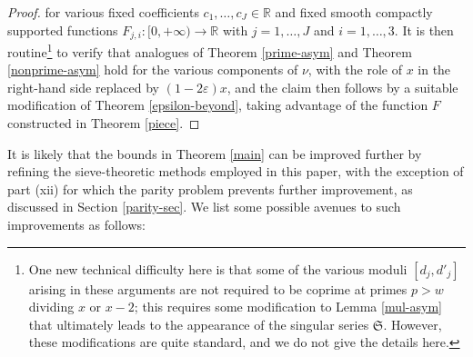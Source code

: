 \documentclass{bmcart}
\theoremstyle{plain}
\theoremstyle{definition}
\newcommand\R{\mathbb{R}}
\newcommand\eps{\varepsilon}
\begin{document}
\begin{proof}
for various fixed coefficients $c_1,\dots,c_J \in \R$ and fixed smooth compactly supported functions $F_{j,i}: [0,+\infty) \to \R$ with $j=1,\dots,J$ and $i=1,\dots,3$.  It is then routine\footnote{One new technical difficulty here is that some of the various moduli $[d_j,d'_j]$ arising in these arguments are not required to be coprime at primes $p > w$ dividing $x$ or $x-2$; this requires some modification to Lemma \ref{mul-asym} that ultimately leads to the appearance of the singular series ${\mathfrak S}$.  However, these modifications are quite standard, and we do not give the details here.} to verify that analogues of Theorem \ref{prime-asym} and Theorem \ref{nonprime-asym} hold for the various components of $\nu$, with the role of $x$ in the right-hand side replaced by $(1-2\eps) x$, and the claim then follows by a suitable modification of Theorem \ref{epsilon-beyond}, taking advantage of the function $F$ constructed in Theorem \ref{piece}.
\end{proof}

It is likely that the bounds in Theorem \ref{main} can be improved further by refining the sieve-theoretic methods employed in this paper, with the exception of part (xii) for which the parity problem prevents further improvement, as discussed in Section \ref{parity-sec}.  We list some possible avenues to such improvements as follows:
\end{document}
